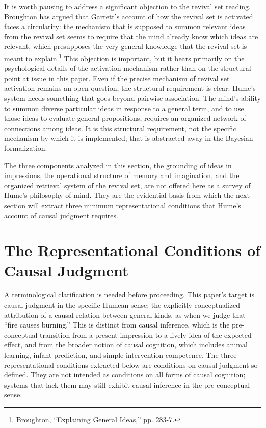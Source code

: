 \documentclass[11pt]{article}
\begin{document}
It is worth pausing to address a significant objection to the revival set reading. Broughton has argued that Garrett's account of how the revival set is activated faces a circularity: the mechanism that is supposed to summon relevant ideas from the revival set seems to require that the mind already know which ideas are relevant, which presupposes the very general knowledge that the revival set is meant to explain.\footnote{Broughton, ``Explaining General Ideas,'' pp. 283-7.} This objection is important, but it bears primarily on the psychological details of the activation mechanism rather than on the structural point at issue in this paper. Even if the precise mechanism of revival set activation remains an open question, the structural requirement is clear: Hume's system needs something that goes beyond pairwise association. The mind's ability to summon diverse particular ideas in response to a general term, and to use those ideas to evaluate general propositions, requires an organized network of connections among ideas. It is this structural requirement, not the specific mechanism by which it is implemented, that is abstracted away in the Bayesian formalization.

The three components analyzed in this section, the grounding of ideas in impressions, the operational structure of memory and imagination, and the organized retrieval system of the revival set, are not offered here as a survey of Hume's philosophy of mind. They are the evidential basis from which the next section will extract three minimum representational conditions that Hume's account of causal judgment requires.

\section{The Representational Conditions of Causal Judgment}

A terminological clarification is needed before proceeding. This paper's target is causal judgment in the specific Humean sense: the explicitly conceptualized attribution of a causal relation between general kinds, as when we judge that ``fire causes burning.'' This is distinct from causal inference, which is the pre-conceptual transition from a present impression to a lively idea of the expected effect, and from the broader notion of causal cognition, which includes animal learning, infant prediction, and simple intervention competence. The three representational conditions extracted below are conditions on causal judgment so defined. They are not intended as conditions on all forms of causal cognition; systems that lack them may still exhibit causal inference in the pre-conceptual sense.
\end{document}
